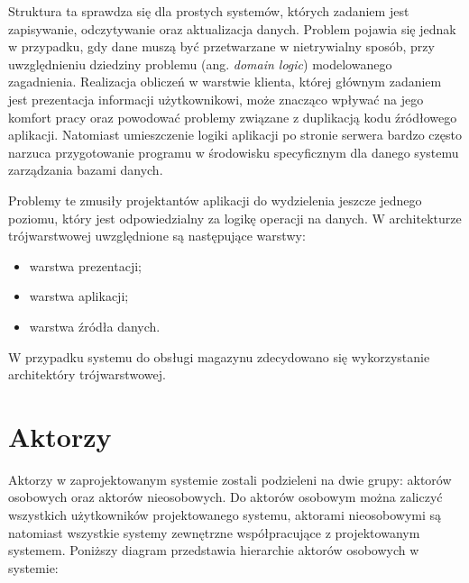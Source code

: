 Struktura ta sprawdza się dla prostych systemów, których zadaniem jest
zapisywanie, odczytywanie oraz aktualizacja danych. Problem
pojawia się jednak w przypadku, gdy dane muszą być przetwarzane w
nietrywialny sposób, przy uwzględnieniu dziedziny problemu (ang. \emph{domain
logic}) modelowanego zagadnienia. Realizacja obliczeń w warstwie klienta,
której głównym zadaniem jest prezentacja informacji użytkownikowi, może
znacząco wpływać na jego komfort pracy oraz powodować problemy związane z
duplikacją kodu źródłowego aplikacji.
Natomiast umieszczenie logiki aplikacji po stronie serwera bardzo często narzuca
przygotowanie programu w środowisku specyficznym dla danego systemu zarządzania
bazami danych. 

Problemy te zmusiły projektantów aplikacji do wydzielenia jeszcze jednego
poziomu, który jest odpowiedzialny za logikę operacji na danych. W
architekturze trójwarstwowej uwzględnione są następujące warstwy:
\begin{itemize}
 \item warstwa prezentacji;
 \item warstwa aplikacji;
 \item warstwa źródła danych.
\end{itemize}


W przypadku systemu do obsługi magazynu zdecydowano się wykorzystanie
architektóry trójwarstwowej.

\section{Aktorzy}

Aktorzy w zaprojektowanym systemie zostali podzieleni na dwie grupy: aktorów
osobowych oraz aktorów nieosobowych. Do aktorów osobowym można zaliczyć
wszystkich użytkowników projektowanego systemu, aktorami nieosobowymi są
natomiast wszystkie systemy zewnętrzne współpracujące z projektowanym systemem.
Poniższy diagram przedstawia hierarchie aktorów osobowych w systemie:

